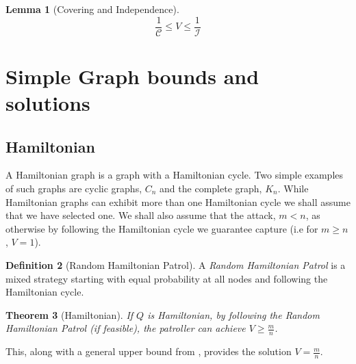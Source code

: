 \documentclass[a4paper,10pt]{article}
\newtheorem{theorem}{Theorem}[section]
\newtheorem{lemma}[theorem]{Lemma}
\theoremstyle{definition}
\newtheorem{definition}[theorem]{Definition}
\theoremstyle{definition}
\theoremstyle{remark}
\theoremstyle{definition}
\begin{document}
\begin{lemma}[Covering and Independence]
$$ \frac{1}{\mathcal{C}} \leq V \leq \frac{1}{\mathcal{I}} $$
\end{lemma}


\section{Simple Graph bounds and solutions}

\subsection{Hamiltonian}
A Hamiltonian graph is a graph with a Hamiltonian cycle. Two simple examples of such graphs are cyclic graphs, $C_{n}$ and the complete graph, $K_{n}$. While Hamiltonian graphs can exhibit more than one Hamiltonian cycle we shall assume that we have selected one. We shall also assume that the attack, $m < n$, as otherwise by following the Hamiltonian cycle we guarantee capture (i.e for $m \geq n$, $V=1$).

\begin{definition}[Random Hamiltonian Patrol]
A \textit{Random Hamiltonian Patrol} is a mixed strategy starting with equal probability at all nodes and following the Hamiltonian cycle.
\end{definition}

\begin{theorem}[Hamiltonian]
If $Q$ is Hamiltonian, by following the Random Hamiltonian Patrol (if feasible), the patroller can achieve $V \geq \frac{m}{n}$.
\end{theorem}

This, along with a general upper bound from \citep{Alpern2011}, provides the solution $V=\frac{m}{n}$.
\end{document}
